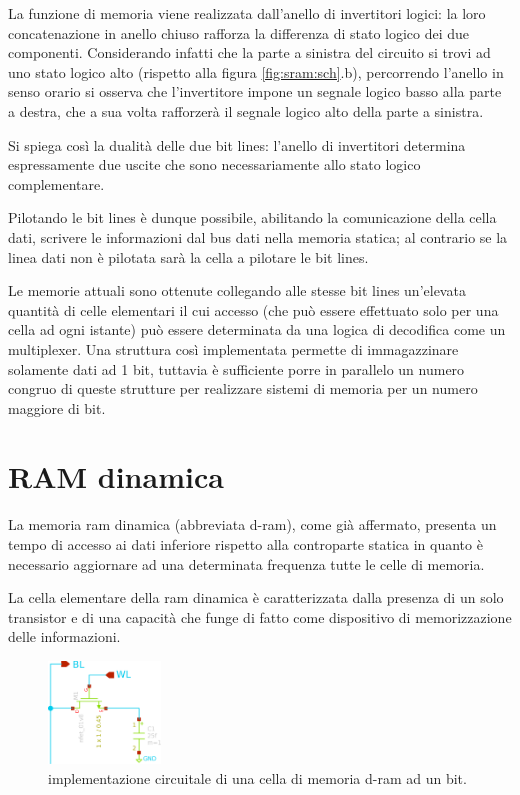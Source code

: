 	La funzione di memoria viene realizzata dall'anello di invertitori logici: la loro concatenazione in anello chiuso rafforza la differenza di stato logico dei due componenti. Considerando infatti che la parte a sinistra del circuito si trovi ad uno stato logico alto (rispetto alla figura \ref{fig:sram:sch}.b), percorrendo l'anello in senso orario si osserva che l'invertitore impone un segnale logico basso alla parte a destra, che a sua volta rafforzerà il segnale logico alto della parte a sinistra.
	
	Si spiega così la dualità delle due bit lines: l'anello di invertitori determina espressamente due uscite che sono necessariamente allo stato logico complementare.
	
	Pilotando le bit lines è dunque possibile, abilitando la comunicazione della cella dati, scrivere le informazioni dal bus dati nella memoria statica; al contrario se la linea dati non è pilotata sarà la cella a pilotare le bit lines.
	
	\vspace{5mm}
	Le memorie attuali sono ottenute collegando alle stesse bit lines un'elevata quantità di celle elementari il cui accesso (che può essere effettuato solo per una cella ad ogni istante) può essere determinata da una logica di decodifica come un multiplexer. Una struttura così implementata permette di immagazzinare solamente dati ad 1 bit, tuttavia è sufficiente porre in parallelo un numero congruo di queste strutture per realizzare sistemi di memoria per un numero maggiore di bit.
	
\section{RAM dinamica}	
	La memoria ram dinamica (abbreviata d-ram), come già affermato, presenta un tempo di accesso ai dati inferiore rispetto alla controparte statica in quanto è necessario aggiornare ad una determinata frequenza tutte le celle di memoria.
	
	La cella elementare della ram dinamica è caratterizzata dalla presenza di un solo transistor e di una capacità che funge di fatto come dispositivo di memorizzazione delle informazioni.
	
	\begin{figure}[bht]
		\centering
		\includegraphics[width=3cm]{Immagini/dram-sch}
		\caption{implementazione circuitale di una cella di memoria d-ram ad un bit.}
		\label{fig:dram:sch}
	\end{figure}


